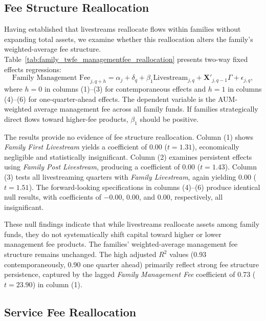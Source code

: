 \documentclass[12pt]{article}
\begin{document}
\subsection{Fee Structure Reallocation}\label{subsec:fee_reallocation}

Having established that livestreams reallocate flows within families without expanding total assets, we examine whether this reallocation alters the family's weighted-average fee structure. Table~\ref{tab:family_twfe_managementfee_reallocation} presents two-way fixed effects regressions:
\begin{equation}
    \label{eq:family_mgmt_fee}
    \text{Family Management Fee}_{j,q+h} = \alpha_j + \delta_q + \beta_1 \text{Livestream}_{j,q} + \mathbf{X}'_{j,q-1} \Gamma + \epsilon_{j,q},
\end{equation}
where $h = 0$ in columns (1)--(3) for contemporaneous effects and $h = 1$ in columns (4)--(6) for one-quarter-ahead effects. The dependent variable is the AUM-weighted average management fee across all family funds. If families strategically direct flows toward higher-fee products, $\beta_1$ should be positive. %

The results provide no evidence of fee structure reallocation. Column (1) shows \textit{Family First Livestream} yields a coefficient of 0.00 ($t = 1.31$), economically negligible and statistically insignificant. Column (2) examines persistent effects using \textit{Family Post Livestream}, producing a coefficient of 0.00 ($t = 1.43$). Column (3) tests all livestreaming quarters with \textit{Family Livestream}, again yielding 0.00 ($t = 1.51$). The forward-looking specifications in columns (4)--(6) produce identical null results, with coefficients of $-0.00$, 0.00, and 0.00, respectively, all insignificant. %

These null findings indicate that while livestreams reallocate assets among family funds, they do not systematically shift capital toward higher or lower management fee products. The families' weighted-average management fee structure remains unchanged. The high adjusted $R^2$ values (0.93 contemporaneously, 0.90 one quarter ahead) primarily reflect strong fee structure persistence, captured by the lagged \textit{Family Management Fee} coefficient of 0.73 ($t = 23.90$) in column (1).

\subsection{Service Fee Reallocation}\label{subsec:service_fee_reallocation}
\end{document}
